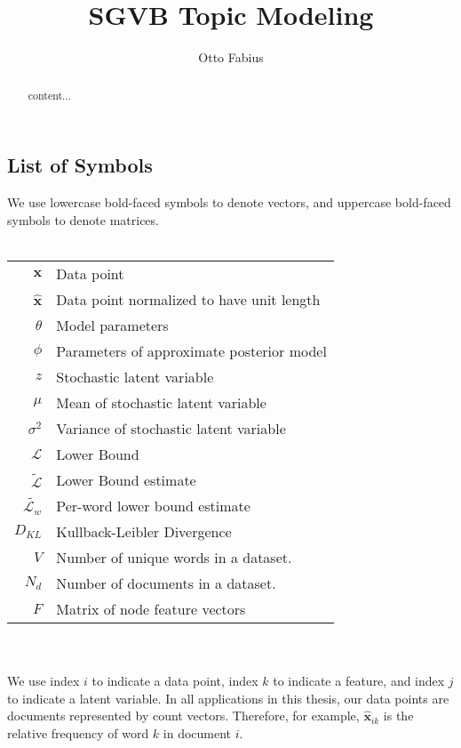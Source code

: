 \documentclass{report}
\author{Otto Fabius}
\title{SGVB Topic Modeling}
\begin{document}
\large
\doublespacing
\maketitle
\begin{abstract}
	content...
\end{abstract}
\chapter*{}
\onehalfspacing
\section*{List of Symbols}
We use lowercase bold-faced symbols to denote vectors, and uppercase bold-faced symbols to denote matrices. \\ \\
\begin{tabular}{r l}
	\hspace{15mm} $\mathbf{x}$ & Data point \\
	$\mathbf{\hat{x}}$ & Data point normalized to have unit length \\	
	$\theta$ &  Model parameters \\
	$\phi$ & Parameters of approximate posterior model \\
	$z$ & Stochastic latent variable\\
	$\mu$ & Mean of stochastic latent variable\\
	$\sigma ^2 $ & Variance of stochastic latent variable \\
	$\mathcal{L}$ & Lower Bound \\
	$\tilde{\mathcal{L}}$ & Lower Bound estimate\\
	$\tilde{\mathcal{L}_w}$ & Per-word lower bound estimate \\
	$D_{KL}$ & Kullback-Leibler Divergence \\
	$V$ & Number of unique words in a dataset. \\
	$N_d$ & Number of documents in a dataset. \\
	$F$ & Matrix of node feature vectors
\end{tabular}
\\ \\
 We use index $i$ to indicate a data point, index $k$ to indicate a feature, and index $j$ to indicate a latent variable. In all applications in this thesis, our data points are documents represented by count vectors. Therefore, for example, $\mathbf{\hat{x}}_{ik}$ is the relative frequency of word $k$ in document $i$.
\end{document}
